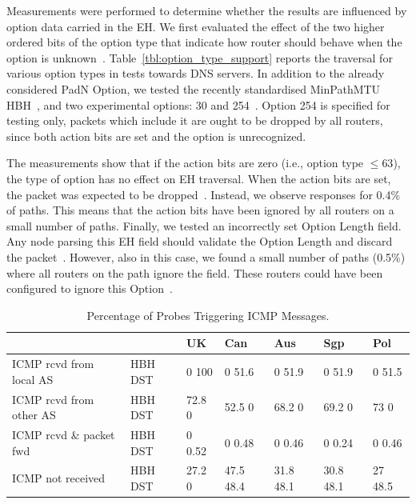 \documentclass[conference]{IEEEtran}
\begin{document}
Measurements were performed to determine whether the results are 
influenced by option data carried in the EH.  We first
evaluated the effect of the two higher ordered bits of the option type
that indicate how router should behave when the option is unknown~\cite{rfc8200}.
Table~\ref{tbl:option_type_support} reports the traversal for various
option types in tests towards DNS servers.  In addition to the already
considered PadN Option, we tested the recently standardised MinPathMTU
HBH~\cite{rfc9268}, and two experimental options: 30 and
254~\cite{RFC4727}. Option 254 is specified for testing
only, packets which include it are ought to be dropped by all routers, since both action bits are set and the option is unrecognized.

The measurements show that if the action bits are zero (i.e., option type
$\le 63$), the type of option has no effect on EH traversal. When the action bits are set, the
packet was expected to be dropped~\cite{rfc8200}.  Instead, we observe
responses for 0.4\% of paths. This means that the action bits have been ignored by all
routers on a small number of paths.
Finally, we tested an incorrectly set Option Length field. Any node parsing
this EH field should validate the Option Length and discard the
packet~\cite{rfc8200}. However, also in this case, we found a small number of
paths (0.5\%) where all routers on the path ignore the field. These routers could have been configured to ignore this Option~\cite{rfc8200}.

\begin{table}[t]
\centering
\caption{Percentage of Probes Triggering ICMP Messages.}
\label{tbl:icmp_support_dst}
\begin{tabular}{p{}|p{}|
p{}|p{}|p{}|p{}|p{}}
                           &          & UK        & Can       & Aus    & Sgp          & Pol     \\
\hline
\hline
{ICMP rcvd from local AS}  & {HBH DST} & {0 100}  & {0 51.6}    & {0 51.9}    & {0 51.9}    & {0 51.5}  \\
\hline
{ICMP rcvd from other AS} & {HBH DST} & {72.8 0} & {52.5 0}    & {68.2 0}    & {69.2 0}    & {73  0}   \\
\hline
{ICMP rcvd \& packet fwd} & {HBH DST} & {0 0.52} & {0 0.48}    & {0 0.46}    & {0 0.24}    & {0 0.46}  \\
\hline
{ICMP not received}        & {HBH DST} & {27.2 0} & {47.5 48.4} & {31.8 48.1} & {30.8 48.1} & {27 48.5} 
\end{tabular}
\end{table}
\end{document}

